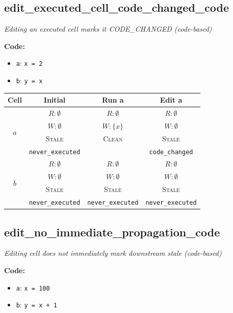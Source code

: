 \documentclass{article}
\begin{document}
\subsection{edit\_executed\_cell\_code\_changed\_code}
\textit{Editing an executed cell marks it CODE\_CHANGED (code-based)}

\textbf{Code:}
\begin{itemize}
  \item \texttt{a}: \verb|x = 2|
  \item \texttt{b}: \verb|y = x|
\end{itemize}

\begin{center}
\small
\begin{tabular}{|c|c|c|c|}
\hline
\textbf{Cell} & \textbf{Initial} & \textbf{Run a} & \textbf{Edit a} \\
\hline
\multirow{4}{*}{$a$}
  & $R: \emptyset$ & $R: \emptyset$ & $R: \emptyset$ \\
  & $W: \emptyset$ & $W: \{x\}$ & $W: \emptyset$ \\
  & \textsc{Stale} & \textsc{Clean} & \textsc{Stale} \\
  & \footnotesize\texttt{never\_executed} &  & \footnotesize\texttt{code\_changed} \\
\hline
\multirow{4}{*}{$b$}
  & $R: \emptyset$ & $R: \emptyset$ & $R: \emptyset$ \\
  & $W: \emptyset$ & $W: \emptyset$ & $W: \emptyset$ \\
  & \textsc{Stale} & \textsc{Stale} & \textsc{Stale} \\
  & \footnotesize\texttt{never\_executed} & \footnotesize\texttt{never\_executed} & \footnotesize\texttt{never\_executed} \\
\hline
\end{tabular}
\end{center}


\subsection{edit\_no\_immediate\_propagation\_code}
\textit{Editing cell does not immediately mark downstream stale (code-based)}

\textbf{Code:}
\begin{itemize}
  \item \texttt{a}: \verb|x = 100|
  \item \texttt{b}: \verb|y = x + 1|
\end{itemize}
\end{document}
